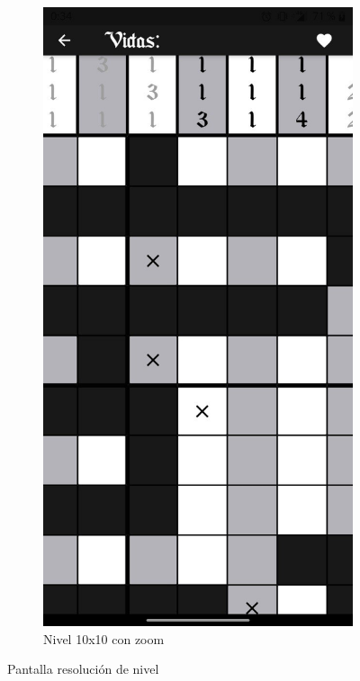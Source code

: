 \begin{figure}[H]
\begin{subfigure}[b]{0.45\linewidth}
    \end{subfigure}
    \begin{subfigure}[b]{0.45\linewidth}
      \includegraphics[width=\linewidth]{images/man7.jpeg}
      \caption{Nivel 10x10 con zoom}
      \label{fig:man1-7}
    \end{subfigure}
    \caption{Pantalla resolución de nivel}
    \label{fig:man4}
  \end{figure}

